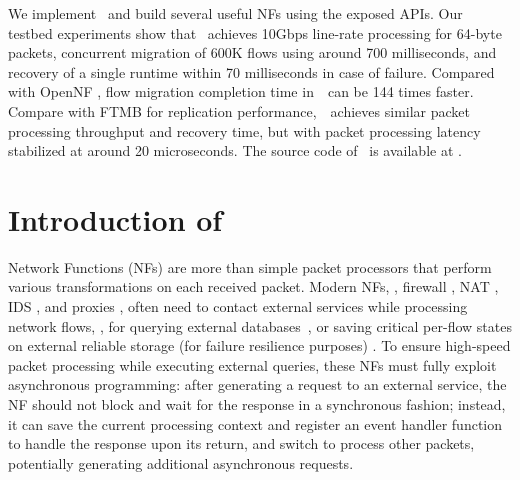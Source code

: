 We implement \nfactor~and build several useful NFs using the exposed APIs. Our testbed experiments show that \nfactor~achieves 10Gbps line-rate processing for 64-byte packets, concurrent migration of 600K flows using around 700 milliseconds, and recovery of a single runtime within 70 milliseconds in case of failure. Compared with OpenNF \cite{gember2015opennf}, flow migration completion time in~\nfactor~can be 144 times faster. Compare with FTMB \cite{sherry2015rollback} for replication performance,~\nfactor~achieves similar packet processing throughput and recovery time, but with packet processing latency stabilized at around 20 microseconds. The source code of \nfactor~is available at \cite{projectcode}.


\section{Introduction of \netstar}

Network Functions (NFs) are more than simple packet processors that perform various transformations on each received packet. Modern NFs, \eg, firewall \cite{201545}, NAT \cite{201545}, IDS \cite{bro}, and proxies \cite{haproxy, project-clearwater}, often need to contact external services while processing network flows, \eg, for
querying external databases~\cite{telephone-number-mapping, bro-scripting-tutorial}, or saving critical per-flow states on external reliable storage (for failure resilience purposes) \cite{201545}. To ensure high-speed packet processing while executing external queries, these NFs must fully exploit asynchronous programming: after generating a request to an external service, the NF should not block and wait for the response in a synchronous fashion; instead, it can save the current processing context and register an event handler function to handle the response upon its return, and switch to process other packets, potentially generating additional asynchronous requests.

